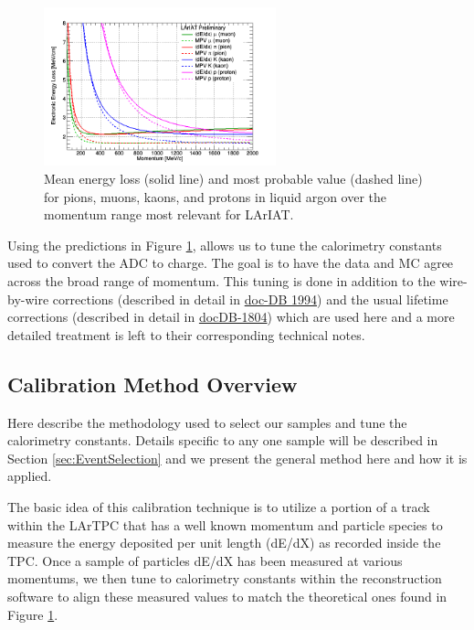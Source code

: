 \begin{figure}[htb]
\centering
\includegraphics[width=0.60\textwidth]{images/dEdXvsMomentumTemplate}
\caption{Mean energy loss (solid line) and most probable value (dashed line) for pions, muons, kaons, and protons in liquid argon over the momentum range most relevant for LArIAT.}
\label{fig:PDGEnergyLossArgon}
\end{figure}

Using the predictions in Figure \ref{fig:PDGEnergyLossArgon}, allows us to tune the calorimetry constants used to convert the ADC to charge. The goal is to have the data and MC agree across the broad range of momentum. This tuning is done in addition to the wire-by-wire corrections (described in detail in \href{http://lartpc-docdb.fnal.gov:8080/cgi-bin/RetrieveFile?docid=1994&filename=investigation-uniformity-observed_v3.pdf&version=2}{doc-DB 1994}) and the usual lifetime corrections (described in detail in \href{http://lartpc-docdb.fnal.gov:8080/cgi-bin/ShowDocument?docid=1804}{docDB-1804}) which are used here and a more detailed treatment is left to their corresponding technical notes.

\subsection{Calibration Method Overview}\label{sec:MethodOverview}

Here describe the methodology used to select our samples and tune the calorimetry constants. Details specific to any one sample will be described in Section  \ref{sec:EventSelection} and we present the general method here and how it is applied. 

The basic idea of this calibration technique is to utilize a portion of a track within the LArTPC that has a well known momentum and particle species to measure the energy deposited per unit length (dE/dX) as recorded inside the TPC. Once a sample of particles dE/dX has been measured at various momentums, we then tune to calorimetry constants within the reconstruction software to align these measured values to match the theoretical ones found in Figure \ref{fig:PDGEnergyLossArgon}.


